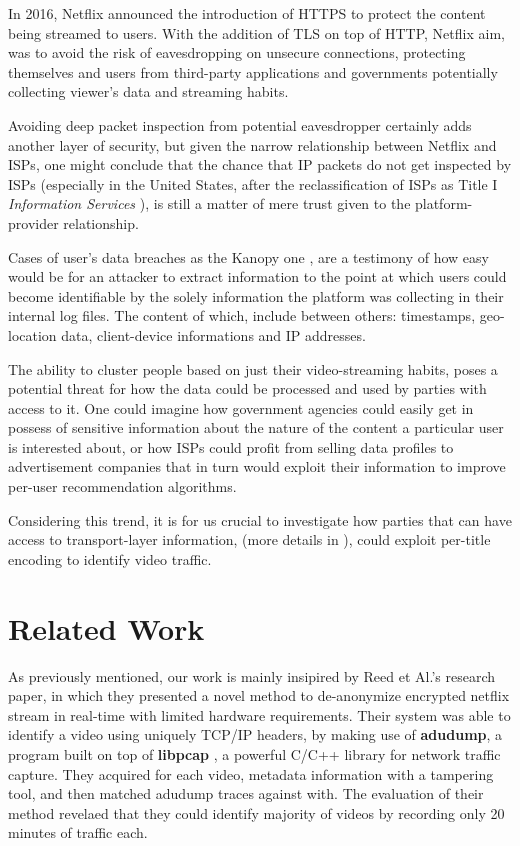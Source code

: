 In 2016, Netflix announced the introduction of HTTPS to protect the content
being streamed to users. With the addition of TLS on top of HTTP, Netflix aim,
was to avoid the risk of eavesdropping on unsecure connections, protecting
themselves and users from third-party applications and governments potentially
collecting viewer's data and streaming habits.

Avoiding deep packet inspection from potential eavesdropper certainly adds
another layer of security, but given the narrow relationship between Netflix
and ISPs, one might conclude that the chance that IP packets do not get
inspected by ISPs (especially in the United States, after the reclassification
of ISPs as Title I \emph{Information Services} \cite{net-neutrality}), is still
a matter of mere trust given to the platform-provider relationship.

Cases of user's data breaches as the Kanopy one \cite{kanopy}, are a testimony
of how easy would be for an attacker to extract information to the point at
which users could become identifiable by the solely information the platform
was collecting in their internal log files. The content of which, include
between others: timestamps, geo-location data, client-device informations and
IP addresses. 

The ability to cluster people based on just their video-streaming habits, poses
a potential threat for how the data could be processed and used by parties with
access to it. One could imagine how government agencies could easily get in
possess of sensitive information about the nature of the content a particular
user is interested about, or how ISPs could profit from selling data profiles
to advertisement companies that in turn would exploit their information to
improve per-user recommendation algorithms.

Considering this trend, it is for us crucial to investigate how parties that
can have access to transport-layer information, (more details in
), could exploit per-title encoding to identify video
traffic. 

\section{Related Work}\label{related}

As previously mentioned, our work is mainly insipired by Reed et Al.'s
\cite{netflix-real-time} research paper, in which they presented a novel method
to de-anonymize encrypted netflix stream in real-time with limited hardware
requirements. Their system was able to identify a video using uniquely TCP/IP
headers, by making use of \textbf{adudump}, a program built on top of
\textbf{libpcap} \cite{libpcap}, a powerful C/C++ library for network traffic
capture. They acquired for each video, metadata information with a tampering
tool, and then matched adudump traces against with. The evaluation of their
method revelaed that they could identify majority of videos by recording only
20 minutes of traffic each.

